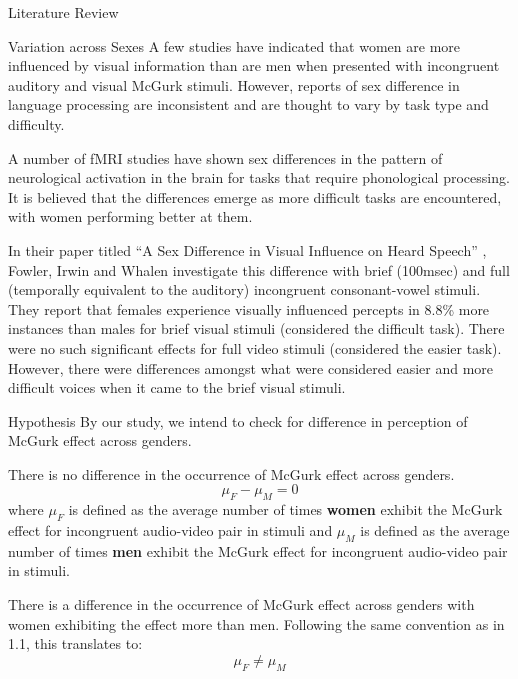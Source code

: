 \documentclass{article}
\begin{document}
\begin{psection}{Literature Review}
\begin{psubsection}{Variation across Sexes}
		A few studies have indicated that women are more influenced by visual information than are men when presented with incongruent auditory and visual McGurk stimuli. However, reports of sex difference in language processing are inconsistent and are thought to vary by task type and difficulty. 

		A number of fMRI studies have shown sex differences in the pattern of neurological activation in the brain for tasks that require phonological processing. It is believed that the differences emerge as more difficult tasks are encountered, with women performing better at them.

		In their paper titled ``A Sex Difference in Visual Influence on Heard Speech'' \cite{sex difference}, Fowler, Irwin and Whalen investigate this difference with brief (100msec) and full (temporally equivalent to the auditory) incongruent consonant-vowel stimuli. They report that females experience visually influenced percepts in 8.8\% more instances than males for brief visual stimuli (considered the difficult task). There were no such significant effects for full video stimuli (considered the easier task). However, there were differences amongst what were considered easier and more difficult voices when it came to the brief visual stimuli. 

	\end{psubsection}

\end{psection}


\begin{psection}{Hypothesis}
	By our study, we intend to check for difference in perception of McGurk effect across genders.

	There is no difference in the occurrence of McGurk effect across genders. 
	\begin{equation}
		\mu_F-\mu_M=0
	\end{equation}
	where $\mu_F$ is defined as the average number of times \textbf{women} exhibit the McGurk effect for incongruent audio-video pair in stimuli and $\mu_M$ is defined as the average number of times \textbf{men} exhibit the McGurk effect for incongruent audio-video pair in stimuli.

	There is a difference in the occurrence of McGurk effect across genders with women exhibiting the effect more than men.
	Following the same convention as in 1.1, this translates to:
	\begin{equation}
		\mu_F \neq \mu_M
	\end{equation}
\end{psection}
\end{document}
